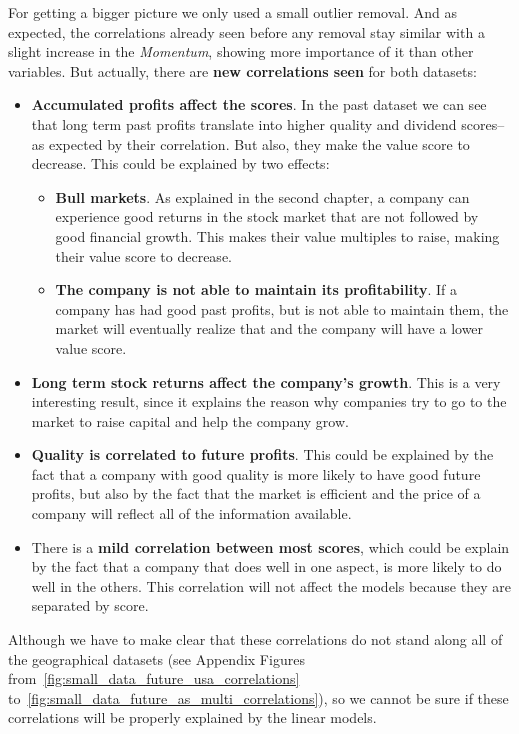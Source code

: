 \documentclass[11pt,english,a4paper,hidelinks]{book}
\begin{document}
\noindent For getting a bigger picture we only used a small outlier removal. And as expected, the correlations already seen before any removal stay similar with a slight increase in the \textit{Momentum}, showing more importance of it than other variables. But actually, there are \textbf{new correlations seen} for both datasets:

\begin{itemize}
    \item  \textbf{Accumulated profits affect the scores}. In the past dataset we can see that long term past profits translate into higher quality and dividend scores-- as expected by their correlation. But also, they make the value score to decrease. This could be explained by two effects:
    \begin{itemize}
        \item \textbf{Bull markets}. As explained in the second chapter, a company can experience good returns in the stock market that are not followed by good financial growth. This makes their value multiples to raise, making their value score to decrease.
        \item \textbf{The company is not able to maintain its profitability}. If a company has had good past profits, but is not able to maintain them, the market will eventually realize that and the company will have a lower value score.
    \end{itemize}
    \item \textbf{Long term stock returns affect the company's growth}. This is a very interesting result, since it explains the reason why companies try to go to the market to raise capital and help the company grow.
    \item \textbf{Quality is correlated to future profits}. This could be explained by the fact that a company with good quality is more likely to have good future profits, but also by the fact that the market is efficient and the price of a company will reflect all of the information available.
    \item There is a \textbf{mild correlation between most scores}, which could be explain by the fact that a company that does well in one aspect, is more likely to do well in the others. This correlation will not affect the models because they are separated by score.
\end{itemize}

\noindent Although we have to make clear that these correlations do not stand along all of the geographical datasets (see Appendix Figures from~\ref{fig:small_data_future_usa_correlations} to~\ref{fig:small_data_future_as_multi_correlations}), so we cannot be sure if these correlations will be properly explained by the linear models.
\end{document}
